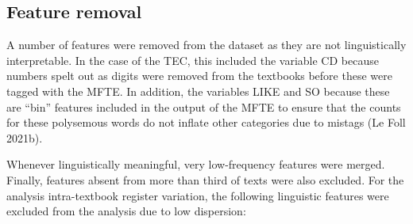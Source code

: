 \documentclass[
  letterpaper,
  DIV=11,
  numbers=noendperiod]{scrreprt}
\begin{document}
\subsection{Feature removal}\label{feature-removal}

A number of features were removed from the dataset as they are not
linguistically interpretable. In the case of the TEC, this included the
variable CD because numbers spelt out as digits were removed from the
textbooks before these were tagged with the MFTE. In addition, the
variables LIKE and SO because these are ``bin'' features included in the
output of the MFTE to ensure that the counts for these polysemous words
do not inflate other categories due to mistags (Le Foll 2021b).

Whenever linguistically meaningful, very low-frequency features were
merged. Finally, features absent from more than third of texts were also
excluded. For the analysis intra-textbook register variation, the
following linguistic features were excluded from the analysis due to low
dispersion:
\end{document}
